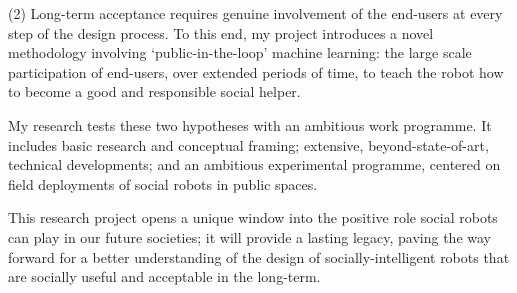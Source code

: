 \documentclass[12pt,a4paper]{article}
\begin{document}
(2) Long-term acceptance requires genuine involvement of the end-users at every
step of the design process. To this end, my project introduces a novel methodology
involving `public-in-the-loop' machine learning: the large scale participation
of end-users, over extended periods of time, to teach the robot how to become a
good and responsible social helper.

My research tests these two hypotheses with an ambitious work programme. It
includes basic research and conceptual framing; extensive, beyond-state-of-art,
technical developments; and an ambitious experimental programme, centered on
field deployments of social robots in public spaces.

This research project opens a unique window into the positive role social robots
can play in our future societies; it will provide a lasting legacy, paving the
way forward for a better understanding of the design of socially-intelligent
robots that are socially useful and acceptable in the long-term.


\newpage

\tableofcontents

\pagebreak




\pagebreak



\pagebreak



\pagebreak


%

\pagebreak
\printbibliography
\end{document}
